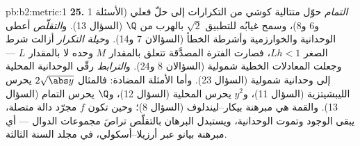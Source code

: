 \begin{solution}{pb:b2:metric:1}
\textbf{25.} \emph{التمام} حوّل متتالية كوشي من
التكرارات إلى حلّ فعلي (الأسئلة 1 و6 و8)، وسمح غيابُه
للتطبيق $\sqrt2$ بالهرب من $\Q$ (السؤال 13).
و\emph{التقلّص} أعطى الوحدانية والخوارزمية
وأشرطة الخطأ (السؤالان 7 و14). و\emph{حيلة التكرار} أزالت
شرط الصغر $Lh < 1$، فصارت الفترة المصدَّقة
تتعلق بالمقدار $M$ وحده لا بالمقدار $L$ --- وجعلت المعادلات الخطية
شمولية (السؤالان 8 و24). و\emph{الترابط} رقّى الوحدانية
المحلية إلى وحدانية شمولية (السؤال 23). وأما
الأمثلة المضادة: فالمثال $2\sqrt{\abs y}$ يحرس الليبشيتزية (السؤال
11)، و$y^2$ يحرس المحلية (السؤال 12)، و$\Q$ يحرس
التمام (السؤال 13). والقمة هي
مبرهنة بيكار--ليندلوف (السؤال 8)؛ وحين تكون $f$ مجرّد
دالة متصلة، يبقى الوجود وتموت الوحدانية، ويستبدل
البرهان بالتقلّص تراصَ مجموعات الدوال
--- أي مبرهنة بيانو عبر أرزيلا--أسكولي، في مجلد السنة
الثالثة.
\end{solution}

